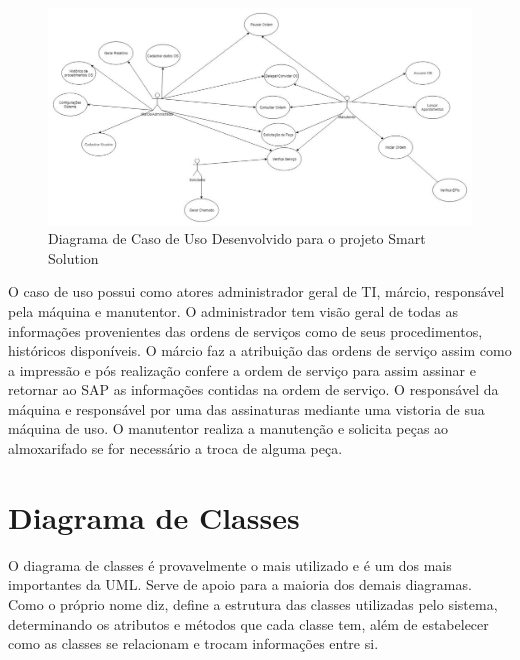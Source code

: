 \begin{figure}[H]
	\caption{\label{novocasodeusointegra}Diagrama de Caso de Uso Desenvolvido para o projeto Smart Solution}
	\begin{center}
		\includegraphics[scale=0.90,angle=90]{./Figuras/novocasodeusointegra}
		
	\end{center}
\end{figure}

\newpage
O caso de uso possui como atores administrador geral de TI, márcio, responsável pela máquina e manutentor. O administrador tem visão geral de todas as informações provenientes das ordens de serviços como de seus procedimentos, históricos disponíveis. O márcio faz a atribuição das ordens de serviço assim como a impressão e pós realização confere a ordem de serviço para assim assinar e retornar ao SAP as informações contidas na ordem de serviço. O responsável da máquina e responsável por uma das assinaturas mediante uma vistoria de sua máquina de uso. O manutentor realiza a manutenção e solicita peças ao almoxarifado se for necessário a troca de alguma peça.



\section{Diagrama de Classes}
O diagrama de classes é provavelmente o mais utilizado e é um dos mais importantes da UML. Serve de apoio para a maioria dos demais diagramas. Como o
próprio nome diz, define a estrutura das classes utilizadas pelo sistema, determinando os atributos e métodos que cada classe tem, além de estabelecer como
as classes se relacionam e trocam informações entre si.\cite{guedes2009uml}

